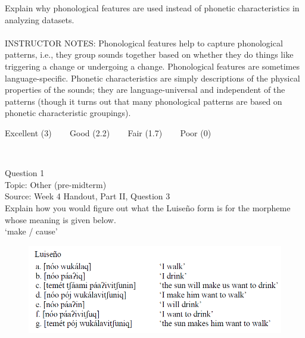 \documentclass[12pt]{article}
\begin{document}
Explain why phonological features are used instead of phonetic characteristics in analyzing datasets.\\


~\\
INSTRUCTOR NOTES: Phonological features help to capture phonological patterns, i.e., they group sounds together based on whether they do things like triggering a change or undergoing a change. Phonological features are sometimes language-specific. Phonetic characteristics are simply descriptions of the physical properties of the sounds; they are language-universal and independent of the patterns (though it turns out that many phonological patterns are based on phonetic characteristic groupings).


\vfill
Excellent (3) ~~~ Good (2.2) ~~~ Fair (1.7) ~~~ Poor (0)
\newpage

\begin{center}
\textbf{{\color{red}{\HUGE END OF EXAM}}}\\

\end{center}
\newpage

\begin{center}
\textbf{{\color{blue}{\HUGE START OF EXAM\\}}}

\textbf{{\color{blue}{\HUGE Student ID: 51697\\}}}

\textbf{{\color{blue}{\HUGE 9:30\\}}}

\end{center}
\newpage

{\large Question 1}\\

Topic: Other (pre-midterm)\\
Source: Week 4 Handout, Part II, Question 3\\

Explain how you would figure out what the Luiseño form is for the morpheme whose meaning is given below.\\

‘make / cause’

\begin{figure}[H]
\includegraphics{../images/luiseno.png}
\end{figure}
\end{document}

